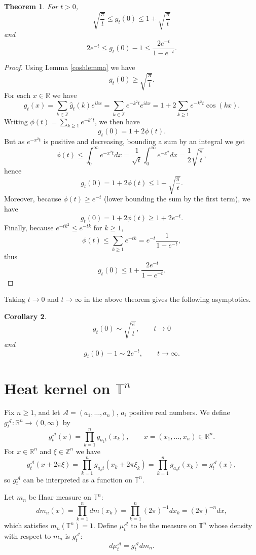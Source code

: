 \documentclass{article}
\newtheorem{theorem}{Theorem}
\newtheorem{corollary}[theorem]{Corollary}
\begin{document}
\begin{theorem}
For $t>0$, 
\[
\sqrt{\frac{\pi}{t}} \leq g_t(0) \leq 1+ \sqrt{\frac{\pi}{t}}
\]
and
\[
2e^{-t} \leq g_t(0) - 1 \leq \frac{2e^{-t}}{1-e^{-t}}.
\]
\label{0inequality}
\end{theorem}
\begin{proof}
Using Lemma \ref{coshlemma} we have
\[
g_t(0) \geq \sqrt{\frac{\pi}{t}}.
\]
For each $x \in \mathbb{R}$ we have
\[
g_t(x)= \sum_{k \in \mathbb{Z}} \hat{g}_t(k) e^{ikx} = \sum_{k \in \mathbb{Z}} e^{-k^2t} e^{ikx} = 
1+2\sum_{k \geq 1} e^{-k^2t} \cos(kx).
\]
Writing $\phi(t)=\sum_{k \geq 1} e^{-k^2t}$, we then have
\[
g_t(0) = 1 + 2\phi(t).
\]
But as $e^{-x^2 t}$ is positive and decreasing, bounding a sum by an integral we get
\[
\phi(t) \leq \int_0^\infty e^{-x^2 t} dx =\frac{1}{\sqrt{t}} \int_0^\infty e^{-x^2} dx = \frac{1}{2} \sqrt{\frac{\pi}{t}},
\]
hence
\[
g_t(0)=1+2\phi(t) \leq 1 + \sqrt{\frac{\pi}{t}}.
\]
Moreover, because $\phi(t) \geq e^{-t}$ (lower bounding the sum by the first term), we have
\[
g_t(0) =1+2\phi(t) \geq 1+2e^{-t}.
\]
Finally, because $e^{-tk^2} \leq e^{-tk}$ for $k \geq 1$,
\[
\phi(t) \leq \sum_{k \geq 1} e^{-tk} = e^{-t} \frac{1}{1-e^{-t}},
\]
thus
\[
g_t(0) \leq 1 + \frac{2e^{-t}}{1-e^{-t}}.
\]
\end{proof}

Taking $t \to 0$ and $t \to \infty$ in the above theorem gives the following asymptotics.

\begin{corollary}
\[
g_t(0) \sim \sqrt{\frac{\pi}{t}}, \qquad t \to 0
\]
and
\[
g_t(0) -1 \sim 2e^{-t}, \qquad t \to \infty.
\]
\end{corollary}


\section{Heat kernel on $\mathbb{T}^n$}
Fix $n \geq 1$, and let $\mathscr{A}=(a_1,\ldots,a_n)$, $a_i$ positive real numbers. We define
$g_t^\mathscr{A}:\mathbb{R}^n \to (0,\infty)$ by 
\[
g_t^\mathscr{A}(x) = \prod_{k=1}^n g_{a_k t}(x_k), \qquad x =(x_1,\ldots,x_n) \in \mathbb{R}^n.
\]
For $x \in \mathbb{R}^n$ and $\xi \in \mathbb{Z}^n$ we have
\[
g_t^\mathscr{A}(x+2\pi \xi)= \prod_{k=1}^n g_{a_k t}(x_k+2\pi \xi_k)
=\prod_{k=1}^n g_{a_k t}(x_k)=
 g_t^\mathscr{A}(x),
\]
so $g_t^\mathscr{A}$ can be interpreted as a function on $\mathbb{T}^n$.

Let $m_n$ be Haar measure on $\mathbb{T}^n$:
\[
dm_n(x) = \prod_{k=1}^n dm(x_k) = \prod_{k=1}^n (2\pi)^{-1} dx_k = (2\pi)^{-n} dx,
\] 
which satisfies $m_n(\mathbb{T}^n)=1$.
Define $\mu_t^\mathscr{A}$ to be the measure on $\mathbb{T}^n$ whose density with respect to $m_n$
is $g_t^\mathscr{A}$:
\[
d\mu_t^{\mathscr{A}} = g_t^{\mathscr{A}} dm_n.
\]
\end{document}
